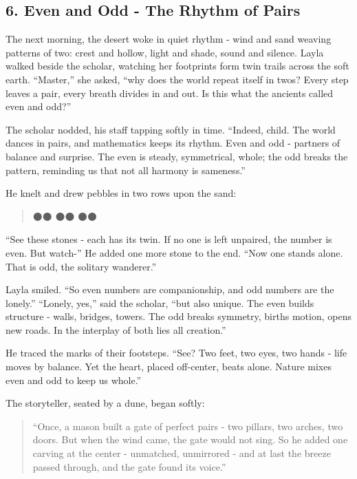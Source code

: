 \documentclass[
  letterpaper,
  DIV=11,
  numbers=noendperiod]{scrreprt}
\begin{document}
\subsection{6. Even and Odd - The Rhythm of
Pairs}\label{even-and-odd---the-rhythm-of-pairs}

The next morning, the desert woke in quiet rhythm - wind and sand
weaving patterns of two: crest and hollow, light and shade, sound and
silence. Layla walked beside the scholar, watching her footprints form
twin trails across the soft earth. ``Master,'' she asked, ``why does the
world repeat itself in twos? Every step leaves a pair, every breath
divides in and out. Is this what the ancients called even and odd?''

The scholar nodded, his staff tapping softly in time. ``Indeed, child.
The world dances in pairs, and mathematics keeps its rhythm. Even and
odd - partners of balance and surprise. The even is steady, symmetrical,
whole; the odd breaks the pattern, reminding us that not all harmony is
sameness.''

He knelt and drew pebbles in two rows upon the sand:

\begin{quote}
⚫⚫ ⚫⚫ ⚫⚫
\end{quote}

``See these stones - each has its twin. If no one is left unpaired, the
number is even. But watch-'' He added one more stone to the end. ``Now
one stands alone. That is odd, the solitary wanderer.''

Layla smiled. ``So even numbers are companionship, and odd numbers are
the lonely.'' ``Lonely, yes,'' said the scholar, ``but also unique. The
even builds structure - walls, bridges, towers. The odd breaks symmetry,
births motion, opens new roads. In the interplay of both lies all
creation.''

He traced the marks of their footsteps. ``See? Two feet, two eyes, two
hands - life moves by balance. Yet the heart, placed off-center, beats
alone. Nature mixes even and odd to keep us whole.''

The storyteller, seated by a dune, began softly:

\begin{quote}
``Once, a mason built a gate of perfect pairs - two pillars, two arches,
two doors. But when the wind came, the gate would not sing. So he added
one carving at the center - unmatched, unmirrored - and at last the
breeze passed through, and the gate found its voice.''
\end{quote}
\end{document}
